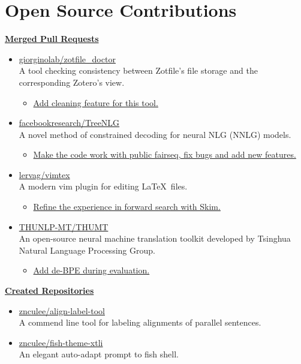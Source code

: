 
\section{\sc Open Source Contributions}

{\bf \href{https://github.com/pulls?q=author%3Aznculee+is%3Amerged}{Merged Pull Requests}}
\begin{itemize}
    \item \href{https://github.com/giorginolab/zotfile_doctor}{giorginolab/zotfile\_doctor} \\
        A tool checking consistency between Zotfile's file storage and the corresponding Zotero's view.
        \begin{itemize}
            \item \href{https://github.com/giorginolab/zotfile_doctor/pull/5}{Add cleaning feature for this tool.}
        \end{itemize}
    \item \href{https://github.com/facebookresearch/TreeNLG}{facebookresearch/TreeNLG} \\
        A novel method of constrained decoding for neural NLG (NNLG) models.
        \begin{itemize}
            \item \href{https://github.com/facebookresearch/TreeNLG/pull/5}{Make the code work with public fairseq, fix bugs and add new features.}
        \end{itemize}
    \item \href{https://github.com/lervag/vimtex}{lervag/vimtex} \\
        A modern vim plugin for editing \LaTeX~files.
        \begin{itemize}
            \item \href{https://github.com/lervag/vimtex/pull/1178}{Refine the experience in forward search with Skim.}
        \end{itemize}
    \item \href{https://github.com/THUNLP-MT/THUMT}{THUNLP-MT/THUMT} \\
        An open-source neural machine translation toolkit developed by Tsinghua Natural Language Processing Group.
        \begin{itemize}
            \item \href{https://github.com/THUNLP-MT/THUMT/pull/45}{Add de-BPE during evaluation.}
        \end{itemize}
\end{itemize}

{\bf \href{https://github.com/znculee?tab=repositories}{Created Repositories}}
\begin{itemize}
    \item \href{https://github.com/znculee/align-label-tool}{znculee/align-label-tool} \\
        A commend line tool for labeling alignments of parallel sentences.
    \item \href{https://github.com/znculee/fish-theme-xtli}{znculee/fish-theme-xtli} \\
        An elegant auto-adapt prompt to fish shell.
\end{itemize}
